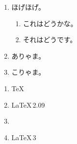 ﻿\documentclass{jarticle}
\begin{document}
\begin{enumerate}[{例題} 1]
  \item\label{exe:a} ほげほげ。
   \begin{enumerate}
    \item これはどうかな。
    \item それはどうです。
   \end{enumerate}
  \item ありゃま。
  \item こりゃま。
\end{enumerate}

\begin{enumerate}
\renewcommand\labelenumi{\MARU{\arabic{enumi}}}
\item \TeX
\item \LaTeX\,2.09
\item \LaTeXe
\item \LaTeX\,3
\end{enumerate} 
\end{document}
